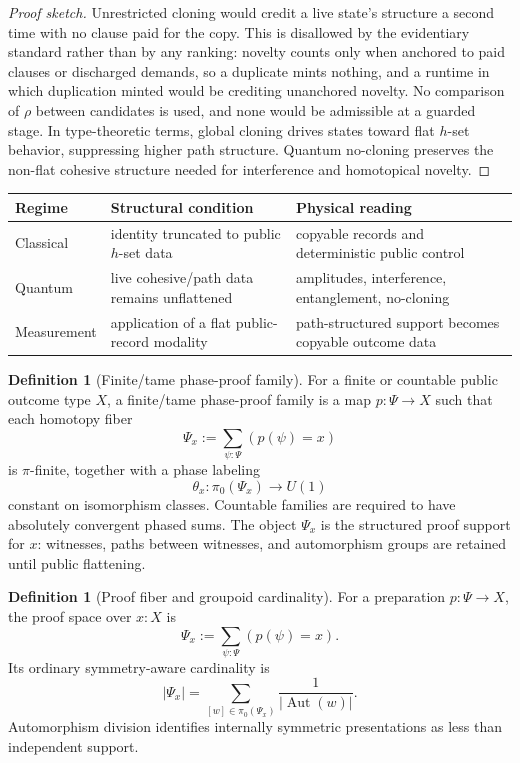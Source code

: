 \documentclass[11pt]{article}
\theoremstyle{plain}
\theoremstyle{definition}
\newtheorem{definition}[theorem]{Definition}
\theoremstyle{remark}
\newenvironment{proofsketch}{\begin{proof}[Proof sketch]}{\end{proof}}
\newcommand{\Aut}{\operatorname{Aut}}
\begin{document}
\begin{proofsketch}
Unrestricted cloning would credit a live state's structure a second time with no clause paid for the copy. This is disallowed by the evidentiary standard rather than by any ranking: novelty counts only when anchored to paid clauses or discharged demands, so a duplicate mints nothing, and a runtime in which duplication minted would be crediting unanchored novelty. No comparison of \(\rho\) between candidates is used, and none would be admissible at a guarded stage. In type-theoretic terms, global cloning drives states toward flat \(h\)-set behavior, suppressing higher path structure. Quantum no-cloning preserves the non-flat cohesive structure needed for interference and homotopical novelty.
\end{proofsketch}

\begin{center}
\small
\begin{tabularx}{\textwidth}{l Y Y}
\toprule
Regime & Structural condition & Physical reading \\
\midrule
Classical & identity truncated to public \(h\)-set data & copyable records and deterministic public control \\
Quantum & live cohesive/path data remains unflattened & amplitudes, interference, entanglement, no-cloning \\
Measurement & application of a flat public-record modality & path-structured support becomes copyable outcome data \\
\bottomrule
\end{tabularx}
\end{center}

\begin{definition}[Finite/tame phase-proof family]
For a finite or countable public outcome type \(X\), a finite/tame phase-proof family is a map \(p:\Psi\to X\) such that each homotopy fiber
\[
\Psi_x:=\sum_{\psi:\Psi}(p(\psi)=x)
\]
is \(\pi\)-finite, together with a phase labeling
\[
\theta_x:\pi_0(\Psi_x)\to U(1)
\]
constant on isomorphism classes. Countable families are required to have absolutely convergent phased sums. The object \(\Psi_x\) is the structured proof support for \(x\): witnesses, paths between witnesses, and automorphism groups are retained until public flattening.
\end{definition}

\begin{definition}[Proof fiber and groupoid cardinality]
For a preparation \(p:\Psi\to X\), the proof space over \(x:X\) is
\[
\Psi_x:=\sum_{\psi:\Psi}(p(\psi)=x).
\]
Its ordinary symmetry-aware cardinality is
\[
|\Psi_x|
=
\sum_{[w]\in\pi_0(\Psi_x)}
\frac{1}{|\Aut(w)|}.
\]
Automorphism division identifies internally symmetric presentations as less than independent support.
\end{definition}
\end{document}
